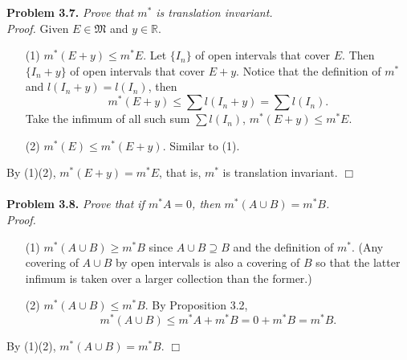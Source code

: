\documentclass{article}
\begin{document}
\textbf{Problem 3.7.}
\emph{Prove that $m^{*}$ is translation invariant.} \\

\emph{Proof.}
Given $E \in \mathfrak{M}$ and $y \in \mathbb{R}$.
\begin{enumerate}
\item[(1)]
$m^{*}(E + y) \leq m^{*}E$.
Let $\{ I_n \}$ of open intervals that cover $E$.
Then $\{ I_n+y \}$ of open intervals that cover $E+y$.
Notice that the definition of $m^{*}$ and $l(I_n+y) = l(I_n)$, then
$$m^{*}(E + y) \leq \sum l(I_n+y) = \sum l(I_n).$$
Take the infimum of all such sum $\sum l(I_n)$,
$m^{*}(E + y) \leq m^{*}E$.
\item[(2)]
$m^{*}(E) \leq m^{*}(E + y)$.
Similar to (1).
\end{enumerate}
By (1)(2), $m^{*}(E + y) = m^{*}E$, that is, $m^{*}$ is translation invariant.
$\Box$ \\\\



\textbf{Problem 3.8.}
\emph{Prove that if $m^{*}A = 0$, then $m^{*}(A \cup B) = m^{*}B$.} \\

\emph{Proof.}
\begin{enumerate}
\item[(1)]
$m^{*}(A \cup B) \geq m^{*}B$ since $A \cup B \supseteq B$
and the definition of $m^{*}$.
(Any covering of $A \cup B$ by open intervals is also a covering of $B$
so that the latter infimum is taken over a larger collection than the former.)
\item[(2)]
$m^{*}(A \cup B) \leq m^{*}B$.
By Proposition 3.2,
$$m^{*}(A \cup B) \leq m^{*}A + m^{*}B = 0 + m^{*}B = m^{*}B.$$
\end{enumerate}
By (1)(2), $m^{*}(A \cup B) = m^{*}B$.
$\Box$ \\\\
\end{document}
